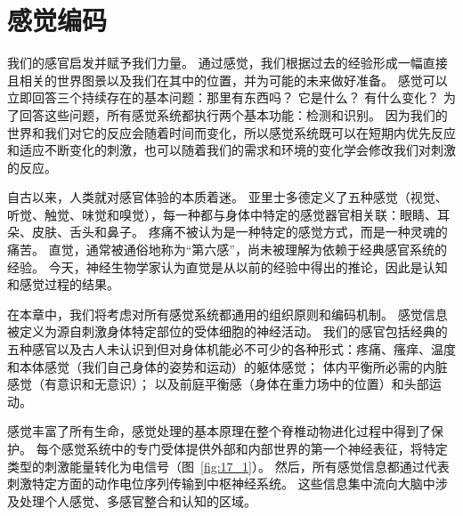 \chapter{感觉编码} \label{chap:chap17}


我们的感官启发并赋予我们力量。 
通过感觉，我们根据过去的经验形成一幅直接且相关的世界图景以及我们在其中的位置，并为可能的未来做好准备。 
感觉可以立即回答三个持续存在的基本问题：那里有东西吗？ 它是什么？ 有什么变化？ 
为了回答这些问题，所有感觉系统都执行两个基本功能：检测和识别。 
因为我们的世界和我们对它的反应会随着时间而变化，所以感觉系统既可以在短期内优先反应和适应不断变化的刺激，也可以随着我们的需求和环境的变化学会修改我们对刺激的反应。


自古以来，人类就对感官体验的本质着迷。
亚里士多德定义了五种感觉（视觉、听觉、触觉、味觉和嗅觉），每一种都与身体中特定的感觉器官相关联：眼睛、耳朵、皮肤、舌头和鼻子。
疼痛不被认为是一种特定的感觉方式，而是一种灵魂的痛苦。
直觉，通常被通俗地称为“第六感”，尚未被理解为依赖于经典感官系统的经验。
今天，神经生物学家认为直觉是从以前的经验中得出的推论，因此是认知和感觉过程的结果。


在本章中，我们将考虑对所有感觉系统都通用的组织原则和编码机制。 
感觉信息被定义为源自刺激身体特定部位的受体细胞的神经活动。 
我们的感官包括经典的五种感官以及古人未认识到但对身体机能必不可少的各种形式：疼痛、瘙痒、温度和本体感觉（我们自己身体的姿势和运动）的躯体感觉； 
体内平衡所必需的内脏感觉（有意识和无意识）； 
以及前庭平衡感（身体在重力场中的位置）和头部运动。


感觉丰富了所有生命，感觉处理的基本原理在整个脊椎动物进化过程中得到了保护。
每个感觉系统中的专门受体提供外部和内部世界的第一个神经表征，将特定类型的刺激能量转化为电信号（图~\ref{fig:17_1}）。 
然后，所有感觉信息都通过代表刺激特定方面的动作电位序列传输到中枢神经系统。
这些信息集中流向大脑中涉及处理个人感觉、多感官整合和认知的区域。


